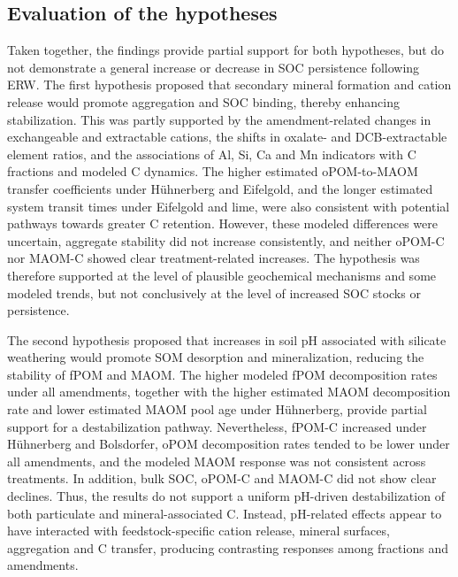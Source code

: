 \documentclass[preprint,12pt]{elsarticle}
\begin{document}
\subsection{Evaluation of the hypotheses}
\label{subsec:hypothesis_evaluation}

Taken together, the findings provide partial support for both hypotheses, but do not demonstrate a general increase or decrease in SOC persistence following ERW. The first hypothesis proposed that secondary mineral formation and cation release would promote aggregation and SOC binding, thereby enhancing stabilization. This was partly supported by the amendment-related changes in exchangeable and extractable cations, the shifts in oxalate- and DCB-extractable element ratios, and the associations of Al, Si, Ca and Mn indicators with C fractions and modeled C dynamics. The higher estimated oPOM-to-MAOM transfer coefficients under Hühnerberg and Eifelgold, and the longer estimated system transit times under Eifelgold and lime, were also consistent with potential pathways towards greater C retention. However, these modeled differences were uncertain, aggregate stability did not increase consistently, and neither oPOM-C nor MAOM-C showed clear treatment-related increases. The hypothesis was therefore supported at the level of plausible geochemical mechanisms and some modeled trends, but not conclusively at the level of increased SOC stocks or persistence.

The second hypothesis proposed that increases in soil pH associated with silicate weathering would promote SOM desorption and mineralization, reducing the stability of fPOM and MAOM. The higher modeled fPOM decomposition rates under all amendments, together with the higher estimated MAOM decomposition rate and lower estimated MAOM pool age under Hühnerberg, provide partial support for a destabilization pathway. Nevertheless, fPOM-C increased under Hühnerberg and Bolsdorfer, oPOM decomposition rates tended to be lower under all amendments, and the modeled MAOM response was not consistent across treatments. In addition, bulk SOC, oPOM-C and MAOM-C did not show clear declines. Thus, the results do not support a uniform pH-driven destabilization of both particulate and mineral-associated C. Instead, pH-related effects appear to have interacted with feedstock-specific cation release, mineral surfaces, aggregation and C transfer, producing contrasting responses among fractions and amendments.
\end{document}
